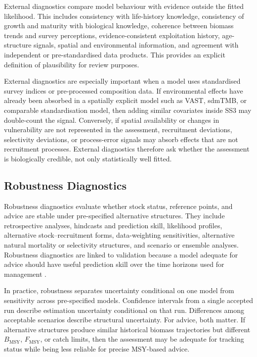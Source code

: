 \documentclass[11pt,a4paper]{article}
\begin{document}
External diagnostics compare model behaviour with evidence outside the fitted likelihood. This includes consistency with life-history knowledge, consistency of growth and maturity with biological knowledge, coherence between biomass trends and survey perceptions, evidence-consistent exploitation history, age-structure signals, spatial and environmental information, and agreement with independent or pre-standardised data products. This provides an explicit definition of plausibility for review purposes.

External diagnostics are especially important when a model uses standardised survey indices or pre-processed composition data. If environmental effects have already been absorbed in a spatially explicit model such as VAST, sdmTMB, or comparable standardisation model, then adding similar covariates inside SS3 may double-count the signal. Conversely, if spatial availability or changes in vulnerability are not represented in the assessment, recruitment deviations, selectivity deviations, or process-error signals may absorb effects that are not recruitment processes. External diagnostics therefore ask whether the assessment is biologically credible, not only statistically well fitted.

\subsection{Robustness Diagnostics}

Robustness diagnostics evaluate whether stock status, reference points, and advice are stable under pre-specified alternative structures. They include retrospective analyses, hindcasts and prediction skill, likelihood profiles, alternative stock--recruitment forms, data-weighting sensitivities, alternative natural mortality or selectivity structures, and scenario or ensemble analyses. Robustness diagnostics are linked to validation because a model adequate for advice should have useful prediction skill over the time horizons used for management \citep{kell2016evaluation,kell2024empirical}.

In practice, robustness separates uncertainty conditional on one model from sensitivity across pre-specified models. Confidence intervals from a single accepted run describe estimation uncertainty conditional on that run. Differences among acceptable scenarios describe structural uncertainty. For advice, both matter. If alternative structures produce similar historical biomass trajectories but different $B_{\mathrm{MSY}}$, $F_{\mathrm{MSY}}$, or catch limits, then the assessment may be adequate for tracking status while being less reliable for precise MSY-based advice.
\end{document}
